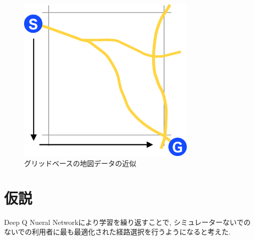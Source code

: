 \begin{figure}[H]
    \centering
    \includegraphics[clip,height = 8.0cm]{assets/GridRouteVector.eps}
    \caption{グリッドベースの地図データの近似} \label{gridroute}
\end{figure}



\section{仮説}

Deep Q Nueral Networkにより学習を繰り返すことで, シミュレーターないでのないでの利用者に最も最適化された経路選択を行うようになると考えた.


